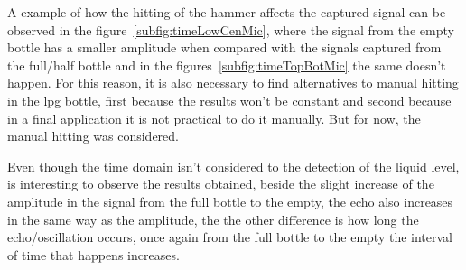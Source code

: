 A example of how the hitting of the hammer affects the captured signal can be observed in the figure~\ref{subfig:timeLowCenMic}, where the signal from the empty bottle has a smaller amplitude when compared with the signals captured from the full/half bottle and in the figures~\ref{subfig:timeTopBotMic} the same doesn't happen. For this reason, it is also necessary to find alternatives to manual hitting in the \acrshort{lpg} bottle, first because the results won't be constant and second because in a final application it is not practical to do it manually. But for now, the manual hitting was considered.

Even though the time domain isn't considered to the detection of the liquid level, is interesting to observe the results obtained, beside the slight increase of the amplitude in the signal from the full bottle to the empty, the echo also increases in the same way as the amplitude, the the other difference is how long the echo/oscillation occurs, once again from the full bottle to the empty the interval of time that happens increases.

